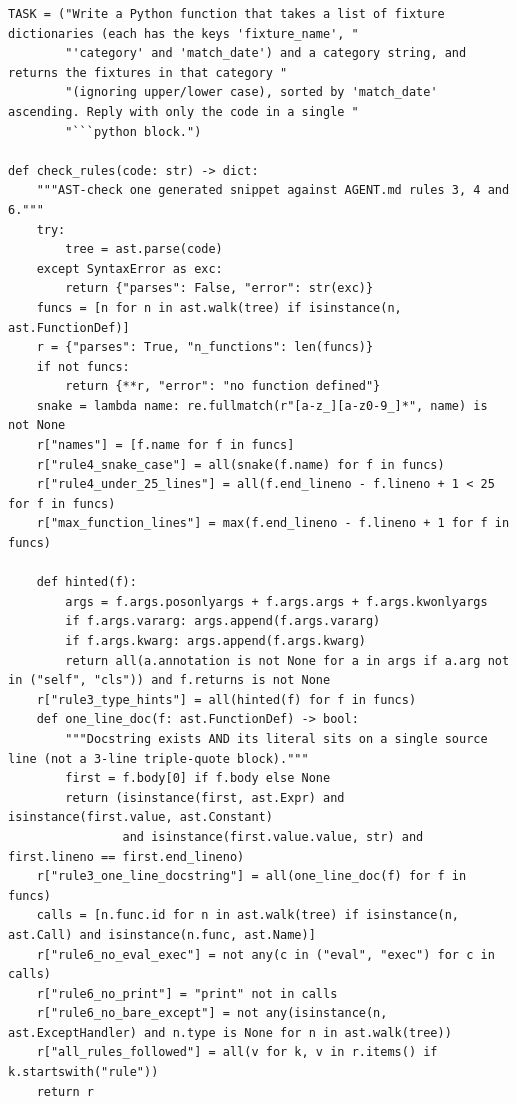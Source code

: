 \documentclass[11pt]{article}
\begin{document}
\begingroup\lstset{basicstyle=\ttfamily\scriptsize}
\begin{lstlisting}
TASK = ("Write a Python function that takes a list of fixture dictionaries (each has the keys 'fixture_name', "
        "'category' and 'match_date') and a category string, and returns the fixtures in that category "
        "(ignoring upper/lower case), sorted by 'match_date' ascending. Reply with only the code in a single "
        "```python block.")

def check_rules(code: str) -> dict:
    """AST-check one generated snippet against AGENT.md rules 3, 4 and 6."""
    try:
        tree = ast.parse(code)
    except SyntaxError as exc:
        return {"parses": False, "error": str(exc)}
    funcs = [n for n in ast.walk(tree) if isinstance(n, ast.FunctionDef)]
    r = {"parses": True, "n_functions": len(funcs)}
    if not funcs:
        return {**r, "error": "no function defined"}
    snake = lambda name: re.fullmatch(r"[a-z_][a-z0-9_]*", name) is not None
    r["names"] = [f.name for f in funcs]
    r["rule4_snake_case"] = all(snake(f.name) for f in funcs)
    r["rule4_under_25_lines"] = all(f.end_lineno - f.lineno + 1 < 25 for f in funcs)
    r["max_function_lines"] = max(f.end_lineno - f.lineno + 1 for f in funcs)

    def hinted(f):
        args = f.args.posonlyargs + f.args.args + f.args.kwonlyargs
        if f.args.vararg: args.append(f.args.vararg)
        if f.args.kwarg: args.append(f.args.kwarg)
        return all(a.annotation is not None for a in args if a.arg not in ("self", "cls")) and f.returns is not None
    r["rule3_type_hints"] = all(hinted(f) for f in funcs)
    def one_line_doc(f: ast.FunctionDef) -> bool:
        """Docstring exists AND its literal sits on a single source line (not a 3-line triple-quote block)."""
        first = f.body[0] if f.body else None
        return (isinstance(first, ast.Expr) and isinstance(first.value, ast.Constant)
                and isinstance(first.value.value, str) and first.lineno == first.end_lineno)
    r["rule3_one_line_docstring"] = all(one_line_doc(f) for f in funcs)
    calls = [n.func.id for n in ast.walk(tree) if isinstance(n, ast.Call) and isinstance(n.func, ast.Name)]
    r["rule6_no_eval_exec"] = not any(c in ("eval", "exec") for c in calls)
    r["rule6_no_print"] = "print" not in calls
    r["rule6_no_bare_except"] = not any(isinstance(n, ast.ExceptHandler) and n.type is None for n in ast.walk(tree))
    r["all_rules_followed"] = all(v for k, v in r.items() if k.startswith("rule"))
    return r


\end{lstlisting}
\end{document}
